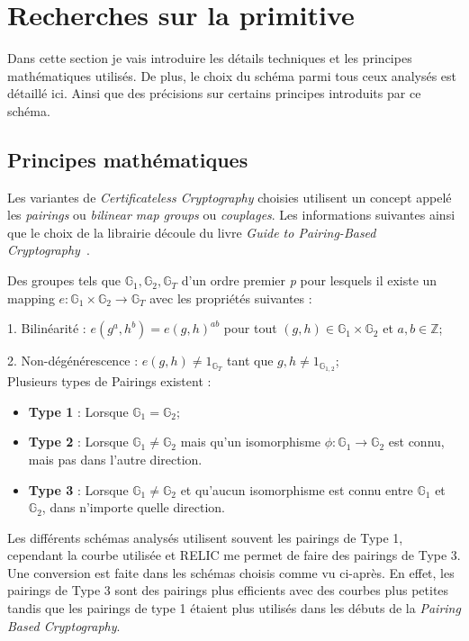 \section{Recherches sur la primitive}
\label{sec:primitiveSearch}
Dans cette section je vais introduire les détails techniques et les principes mathématiques utilisés. De plus, le choix du schéma parmi tous ceux analysés est détaillé ici. Ainsi que des précisions sur certains principes introduits par ce schéma.
\subsection{Principes mathématiques}
\label{subsec:mathPairings}
Les variantes de \textit{Certificateless Cryptography} choisies utilisent un concept appelé les \textit{pairings} ou \textit{bilinear map groups} ou \textit{couplages}. Les informations suivantes ainsi que le choix de la librairie découle du livre \textit{Guide to Pairing-Based Cryptography}~\cite{bookPairing}.

Des groupes tels que $\mathbb{G}_1, \mathbb{G}_2, \mathbb{G}_T$ d'un ordre premier \textit{p} pour lesquels il existe un mapping $e : \mathbb{G}_1 \times \mathbb{G}_2 \rightarrow \mathbb{G}_T$ avec les propriétés suivantes :

1. Bilinéarité : $e(g^a, h^b) = e(g, h)^{ab}$ pour tout $(g,h) \in \mathbb{G}_1 \times \mathbb{G}_2$ et $a,b \in \mathbb{Z}$;

2. Non-dégénérescence : $e(g,h) \neq 1_{\mathbb{G}_T} $ tant que $g,h \neq 1_{\mathbb{G}_{1,2}}$;\\
Plusieurs types de Pairings existent :

\begin{itemize}
	\item \textbf{Type 1} : Lorsque $\mathbb{G}_1 = \mathbb{G}_2$;
	\item \textbf{Type 2} : Lorsque $\mathbb{G}_1 \ne \mathbb{G}_2$ mais qu'un isomorphisme $\phi : \mathbb{G}_1 \rightarrow \mathbb{G}_2$ est connu, mais pas dans l'autre direction.
	\item \textbf{Type 3} : Lorsque $\mathbb{G}_1 \ne \mathbb{G}_2$ et qu'aucun isomorphisme est connu entre $\mathbb{G}_1$ et $\mathbb{G}_2$, dans n'importe quelle direction.
\end{itemize}
Les différents schémas analysés utilisent souvent les pairings de Type 1, cependant la courbe utilisée et RELIC me permet de faire des pairings de Type 3. Une conversion est faite dans les schémas choisis comme vu ci-après. En effet, les pairings de Type 3 sont des pairings plus efficients avec des courbes plus petites tandis que les pairings de type 1 étaient plus utilisés dans les débuts de la \textit{Pairing Based Cryptography}.
